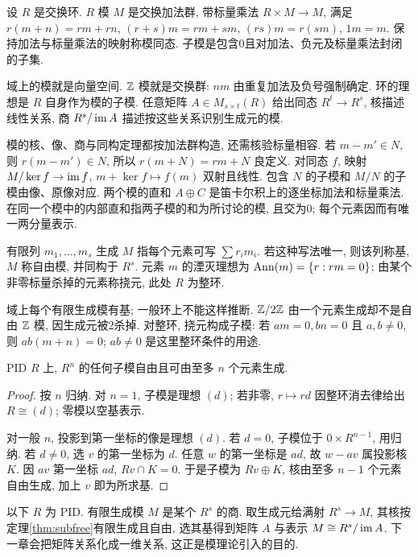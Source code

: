 \begin{definition}
设 $R$ 是交换环. $R$ 模 $M$ 是交换加法群, 带标量乘法 $R\times M\to M$, 满足 $r(m+n)=rm+rn$, $(r+s)m=rm+sm$, $(rs)m=r(sm)$, $1m=m$. 保持加法与标量乘法的映射称模同态. 子模是包含0且对加法、负元及标量乘法封闭的子集.
\end{definition}
域上的模就是向量空间. $\mathbb Z$ 模就是交换群: $nm$ 由重复加法及负号强制确定. 环的理想是 $R$ 自身作为模的子模. 任意矩阵 $A\in M_{s\times t}(R)$ 给出同态 $R^t\to R^s$, 核描述线性关系, 商 $R^s/\operatorname{im} A$ 描述按这些关系识别生成元的模.

模的核、像、商与同构定理都按加法群构造, 还需核验标量相容. 若 $m-m'\in N$, 则 $r(m-m')\in N$, 所以 $r(m+N)=rm+N$ 良定义. 对同态 $f$, 映射 $M/\ker f\to\operatorname{im} f$, $m+\ker f\mapsto f(m)$ 双射且线性. 包含 $N$ 的子模和 $M/N$ 的子模由像、原像对应.
两个模的直和 $A\oplus C$ 是笛卡尔积上的逐坐标加法和标量乘法. 在同一个模中的内部直和指两子模的和为所讨论的模, 且交为0; 每个元素因而有唯一两分量表示.

\begin{definition}
有限列 $m_1,\ldots,m_s$ 生成 $M$ 指每个元素可写 $\sum r_im_i$. 若这种写法唯一, 则该列称基, $M$ 称自由模, 并同构于 $R^s$. 元素 $m$ 的湮灭理想为 $\operatorname{Ann}(m)=\{r:rm=0\}$; 由某个非零标量杀掉的元素称挠元, 此处 $R$ 为整环.
\end{definition}
域上每个有限生成模有基; 一般环上不能这样推断. $\mathbb Z/2\mathbb Z$ 由一个元素生成却不是自由 $\mathbb Z$ 模, 因生成元被2杀掉. 对整环, 挠元构成子模: 若 $am=0,bn=0$ 且 $a,b\ne0$, 则 $ab(m+n)=0$; $ab\ne0$ 是这里整环条件的用途.
\begin{theorem}\label{thm:subfree}
PID $R$ 上, $R^n$ 的任何子模自由且可由至多 $n$ 个元素生成.
\end{theorem}
\begin{proof}
按 $n$ 归纳. 对 $n=1$, 子模是理想 $(d)$; 若非零, $r\mapsto rd$ 因整环消去律给出 $R\cong(d)$; 零模以空基表示.

对一般 $n$, 投影到第一坐标的像是理想 $(d)$. 若 $d=0$, 子模位于 $0\times R^{n-1}$, 用归纳. 若 $d\ne0$, 选 $v$ 的第一坐标为 $d$. 任意 $w$ 的第一坐标是 $ad$, 故 $w-av$ 属投影核 $K$. 因 $av$ 第一坐标 $ad$, $Rv\cap K=0$. 于是子模为 $Rv\oplus K$, 核由至多 $n-1$ 个元素自由生成, 加上 $v$ 即为所求基.
\end{proof}
以下 $R$ 为 PID. 有限生成模 $M$ 是某个 $R^s$ 的商. 取生成元给满射 $R^s\to M$, 其核按定理\ref{thm:subfree}有限生成且自由, 选其基得到矩阵 $A$ 与表示 $M\cong R^s/\operatorname{im} A$. 下一章会把矩阵关系化成一维关系, 这正是模理论引入的目的.

